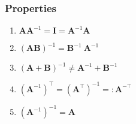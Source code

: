 \subsubsection{Properties}

\begin{multicols}{2}
\begin{enumerate}
    \item $\bm{A}\bm{A}^{-1} = \bm{I} = \bm{A}^{-1}\bm{A}$
    \hfill \cite{mfml/book/mml/Deisenroth-Faisal-Ong}

    \item $(\bm{A}\bm{B})^{-1} = \bm{B}^{-1}\ \bm{A}^{-1}$
    \hfill \cite{mfml/book/mml/Deisenroth-Faisal-Ong}

    \item $(\bm{A} + \bm{B})^{-1} \neq \bm{A}^{-1} + \bm{B}^{-1}$
    \hfill \cite{mfml/book/mml/Deisenroth-Faisal-Ong}

    \item $(\bm{A}^{-1})^\top = (\bm{A}^\top)^{-1} =: \bm{A}^{-\top}$
    \hfill \cite{mfml/book/mml/Deisenroth-Faisal-Ong}

    \item $(\bm{A}^{-1})^{-1} =  \bm{A}$
    
\end{enumerate}
\end{multicols}

